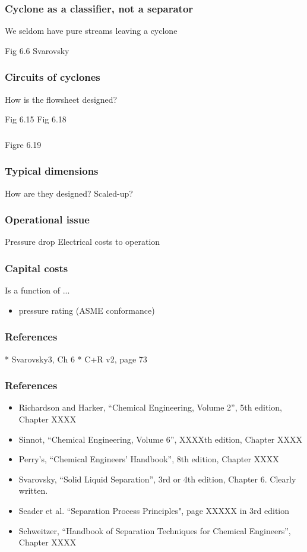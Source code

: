 \begin{frame}\frametitle{Cyclone as a classifier, not a separator}
	We seldom have pure streams leaving a cyclone
	
	Fig 6.6 Svarovsky
\end{frame}

\begin{frame}\frametitle{Circuits of cyclones}
	How is the flowsheet designed?

	Fig 6.15
	Fig 6.18
\end{frame}

\begin{frame}\frametitle{}
	Figre 6.19
\end{frame}

\begin{frame}\frametitle{Typical dimensions}
	How are they designed?
	Scaled-up?	
\end{frame}

\begin{frame}\frametitle{Operational issue}
	Pressure drop
	Electrical costs to operation
\end{frame}

\begin{frame}\frametitle{Capital costs}
	Is a function of ...
	\begin{itemize}
		\item	pressure rating (ASME conformance)
	\end{itemize}
\end{frame}

\begin{frame}\frametitle{References}
	* Svarovsky3, Ch 6
	* C+R v2, page 73
\end{frame}

\begin{frame}\frametitle{References}
	\begin{itemize}
		\item	Richardson and Harker, ``Chemical Engineering, Volume 2'', 5th edition, Chapter XXXX
		\item	Sinnot, ``Chemical Engineering, Volume 6'', XXXXth edition, Chapter XXXX
		\item	Perry's, ``Chemical Engineers' Handbook'', 8th edition, Chapter XXXX
		\item	Svarovsky, ``Solid Liquid Separation'', 3rd or 4th edition, Chapter 6. Clearly written.
		\item	Seader et al. ``Separation Process Principles", page XXXXX in 3rd edition 
		\item	Schweitzer, ``Handbook of Separation Techniques for Chemical Engineers'', Chapter XXXX
	\end{itemize}
\end{frame}

